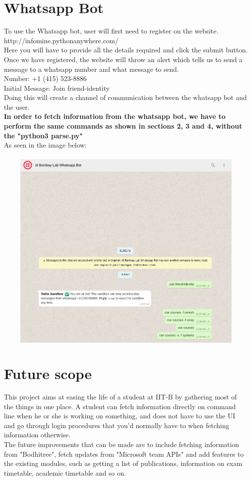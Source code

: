 \documentclass[12pt, letterpaper, twoside]{article}
\begin{document}
\section{Whatsapp Bot}

To use the Whatsapp bot, user will first need to register on the website.\\
http://infomine.pythonanywhere.com/ \\
Here you will have to provide all the details required and click the submit button. Once we have registered, the website will throw an alert which tells us to send a message to a whatsapp number and what message to send.\\
Number: +1 (415) 523-8886 \\
Initial Message: Join friend-identity \\
Doing this will create a channel of communication between the whatsapp bot and the user. \\
\textbf{In order to fetch information from the whatsapp bot, we have to perform the same commands as shown in sections 2, 3 and 4, without the "python3 parse.py"}\\
As seen in the image below: \\
\\
\includegraphics[width=14cm, height=10cm]{Latex_Image}

\section{Future scope}
This project aims at easing the life of a student at IIT-B by gathering most of the things in one place. A student can fetch information directly on command line when he or she is working on something, and does not have to use the UI and go through login procedures that you'd normally have to when fetching information otherwise.\\
The future improvements that can be made are to include fetching information from "Bodhitree", fetch updates from "Microsoft team APIs" and add features to the existing modules, such as getting a list of publications, information on exam timetable, academic timetable and so on.
\end{document}
